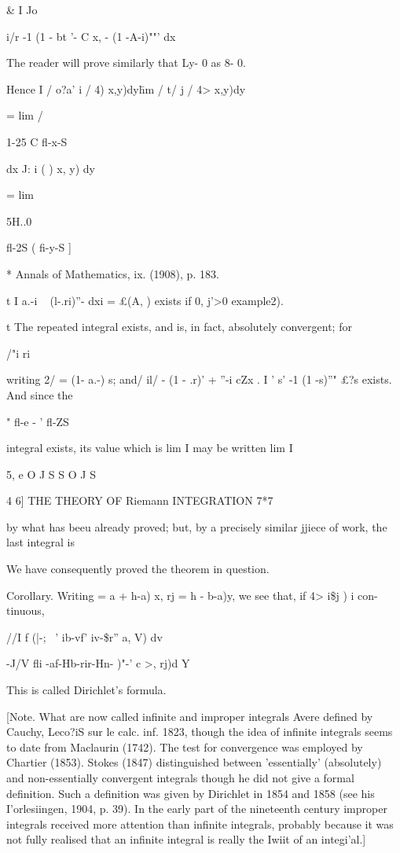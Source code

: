   \& I Jo

 i/r -1 (1 - bt '- C x, - (1 -A-i)""' dx

The reader will prove similarly that Ly- 0 as 8- 0.

Hence I / o?a' i / 4) x,y)dy\= hm / t/ j / 4> x,y)dy\

= lim /

1-25 C fl-x-S

dx J: i ( ) x, y) dy

= lim

5H..0

fl-2S ( fi-y-S ]

* Annals of Mathematics, ix. (1908), p. 183.

t I a.-i ~ (l-.ri)''- dxi = £(A, ) exists if 0, j'>0 example2).

t The repeated integral exists, and is, in fact, absolutely
convergent; for

/"i ri

writing 2/ = (1- a.-) s; and/ il/ - (1 - .r)' + ''-i cZx . I ' s' -1
(1 -s)''" £?s exists. And since the

 " fl-e - ' fl-ZS

integral exists, its value which is lim I may be written lim I

5, e O J S S O J S

4 6] THE THEORY OF Riemann INTEGRATION 7*7

by what has beeu already proved; but, by a precisely similar jjiece
of work, the last integral is

We have consequently proved the theorem in question.

Corollary. Writing = a + h-a) x, rj = h - b-a)y, we see that, if 4>
i\$j ) i con- tinuous,

//I f (|-; ~' ib-vf' iv-\$r'' a, V) dv

-J/V fli -af-Hb-rir-Hn- )"-' c >, rj)d Y

This is called Dirichlet's formula.

[Note. What are now called infinite and improper integrals Avere
defined by Cauchy, Leco?iS sur le calc. inf. 1823, though the idea of
infinite integrals seems to date from Maclaurin (1742). The test for
convergence was employed by Chartier (1853). Stokes (1847)
distinguished between 'essentially' (absolutely) and non-essentially
convergent integrals though he did not give a formal definition. Such
a definition was given by Dirichlet in 1854 and 1858 (see his
I'orlesiingen, 1904, p. 39). In the early part of the nineteenth
century improper integrals received more attention than infinite
integrals, probably because it was not fully realised that an infinite
integral is really the Iwiit of an integi'al.]

